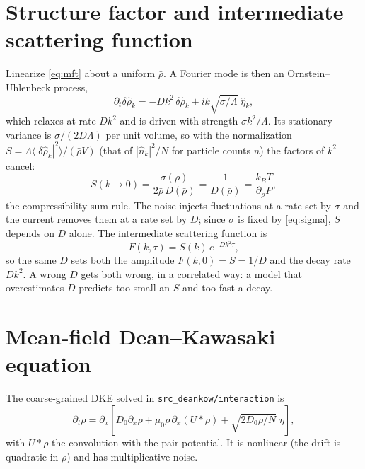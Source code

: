 \documentclass[11pt]{article}
\newcommand{\code}[1]{\texttt{#1}}
\begin{document}
\section{Structure factor and intermediate scattering function}\label{sec:S}

Linearize \eqref{eq:mft} about a uniform $\bar\rho$. A Fourier mode is then an
Ornstein--Uhlenbeck process,
\begin{equation}
  \partial_t\delta\hat\rho_k = -D k^2\,\delta\hat\rho_k
     + ik\sqrt{\sigma/\Lambda}\;\hat\eta_k ,
\end{equation}
which relaxes at rate $Dk^2$ and is driven with strength $\sigma k^2/\Lambda$.
Its stationary variance is $\sigma/(2D\Lambda)$ per unit volume, so with the
normalization $S = \Lambda\langle|\delta\hat\rho_k|^2\rangle/(\bar\rho V)$
(that of $|\hat n_k|^2/N$ for particle counts $n$) the factors of $k^2$ cancel:
\begin{equation}\label{eq:S}
  S(k\to0) = \frac{\sigma(\bar\rho)}{2\bar\rho\,D(\bar\rho)} = \frac{1}{D(\bar\rho)}
  = \frac{k_BT}{\partial_\rho P},
\end{equation}
the compressibility sum rule. The noise injects fluctuations at a rate set by
$\sigma$ and the current removes them at a rate set by $D$; since $\sigma$ is
fixed by \eqref{eq:sigma}, $S$ depends on $D$ alone. The intermediate
scattering function is
\begin{equation}\label{eq:F}
  F(k,\tau) = S(k)\,e^{-D k^2 \tau},
\end{equation}
so the same $D$ sets both the amplitude $F(k,0)=S=1/D$ and the decay rate
$Dk^2$. A wrong $D$ gets both wrong, in a correlated way: a model that
overestimates $D$ predicts too small an $S$ and too fast a decay.

\section{Mean-field Dean--Kawasaki equation}\label{sec:dk}

The coarse-grained DKE solved in \code{src\_deankow/interaction} is
\begin{equation}\label{eq:dk}
  \partial_t\rho = \partial_x\!\left[D_0\partial_x\rho
     + \mu_0\rho\,\partial_x(U*\rho) + \sqrt{2D_0\rho/N}\;\eta\right],
\end{equation}
with $U*\rho$ the convolution with the pair potential. It is nonlinear (the
drift is quadratic in $\rho$) and has multiplicative noise.
\end{document}

